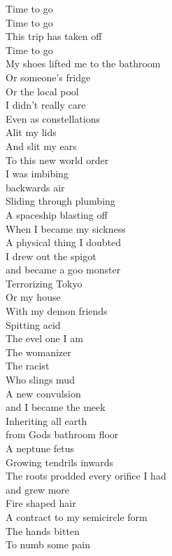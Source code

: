 Time to go\\
Time to go\\
This trip has taken off\\
Time to go\\

My shoes lifted me to the bathroom\\
Or someone's fridge\\
Or the local pool\\
I didn't really care\\

Even as constellations\\
Alit my lids\\
And slit my ears\\
To this new world order\\

I was imbibing\\
backwards air\\
Sliding through plumbing\\
A spaceship blasting off\\

When I became my sickness\\
A physical thing I doubted\\
I drew out the spigot\\
and became a goo monster\\

Terrorizing Tokyo\\
Or my house\\
With my demon friends\\
Spitting acid\\

The evel one I am\\
The womanizer\\
The racist\\
Who slings mud\\

A new convulsion\\
and I became the meek\\
Inheriting all earth\\
from Gods bathroom floor\\

A neptune fetus\\
Growing tendrils inwards\\
The roots prodded every orifice I had\\
and grew more\\

Fire shaped hair\\
A contract to my semicircle form\\
The hands bitten\\
To numb some pain\\

